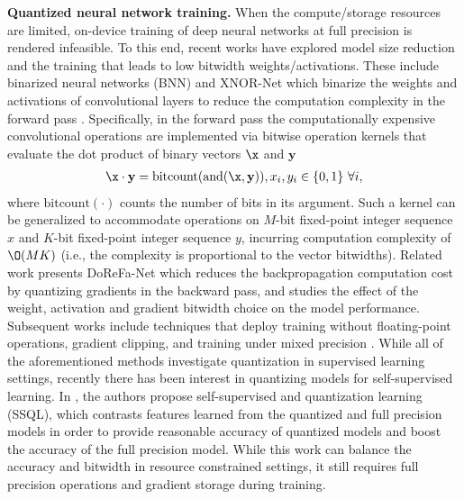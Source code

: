 {\bf Quantized neural network training.} 
When the compute/storage resources are limited, on-device training of deep neural networks at full precision is rendered infeasible. To this end, recent works have explored model size reduction and the training that leads to low bitwidth weights/activations. These include binarized neural networks (BNN) and XNOR-Net which binarize the weights and activations of convolutional layers to reduce the computation complexity in the forward pass \cite{hubara2017quantized, rastegari2016xnor}.
Specifically, in the forward pass the computationally expensive convolutional operations are implemented via bitwise operation kernels that evaluate the dot product of binary vectors $\x$ and $\mathbf{y}$
\begin{align*}
    \x \cdot \mathbf{y} = \mathrm{bitcount}(\mathrm{and} (\x, \mathbf{y})), x_i, y_i \in \{0, 1 \} \ \forall i,
\end{align*}
where $\mathrm{bitcount}(\cdot)$ counts the number of bits in its argument. Such a kernel can be generalized to accommodate operations on $M$-bit fixed-point integer sequence $x$ and $K$-bit fixed-point integer sequence $y$, incurring computation complexity of $\O(MK)$ (i.e., the complexity is proportional to the vector bitwidths). Related work \cite{zhou2016dorefa} presents DoReFa-Net which reduces the backpropagation computation cost by quantizing gradients in the backward pass, and studies the effect of the weight, activation and gradient bitwidth choice on the model performance. Subsequent works include techniques that deploy training without floating-point operations, gradient clipping, and training under mixed precision \cite{wen2017terngrad, zhang2017zipml, zhu2020towards, zhang2020fixed}. While all of the aforementioned methods investigate quantization in supervised learning settings, recently there has been interest in quantizing models for self-supervised learning. In \cite{cao2022synergistic}, the authors propose self-supervised and quantization learning (SSQL), which contrasts features learned from the quantized and full precision models in order to provide reasonable accuracy of quantized models and boost the accuracy of the full precision model. While this work can balance the accuracy and bitwidth in resource constrained settings, it still requires full precision operations and gradient storage during training. 


